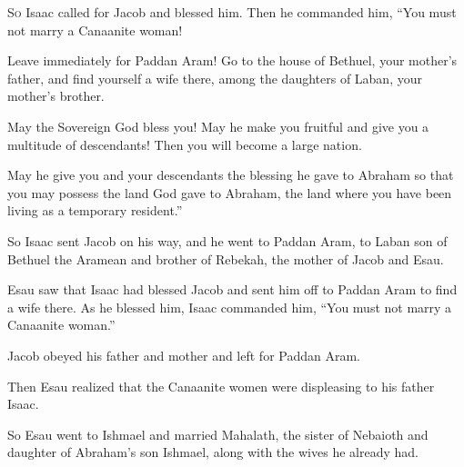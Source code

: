 \begin{scripture}
 \allowchapbreak\hypertarget{ch-genesis-28}{}\lettrine[lines=5]{\color{pentateuch}S}{\textsc{o}} Isaac called for Jacob and blessed him. Then he commanded him, ``You must not marry a Canaanite woman!\everypar{}
 Leave immediately for Paddan Aram! Go to the house of Bethuel, your mother's father, and find yourself a wife there, among the daughters of Laban, your mother's brother.
 May the Sovereign God bless you! May he make you fruitful and give you a multitude of descendants! Then you will become a large nation.
 May he give you and your descendants the blessing he gave to Abraham so that you may possess the land God gave to Abraham, the land where you have been living as a temporary resident.''
 So Isaac sent Jacob on his way, and he went to Paddan Aram, to Laban son of Bethuel the Aramean and brother of Rebekah, the mother of Jacob and Esau.
\everypar{}

 Esau saw that Isaac had blessed Jacob and sent him off to Paddan Aram to find a wife there. As he blessed him, Isaac commanded him, ``You must not marry a Canaanite woman.''
 Jacob obeyed his father and mother and left for Paddan Aram.
 Then Esau realized that the Canaanite women were displeasing to his father Isaac.
 So Esau went to Ishmael and married Mahalath, the sister of Nebaioth and daughter of Abraham's son Ishmael, along with the wives he already had.
\everypar{}


\end{scripture}
